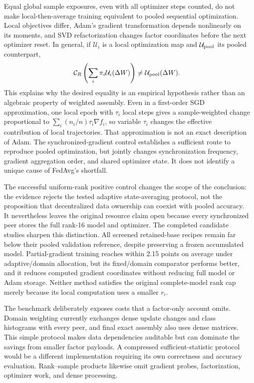 \documentclass[11pt]{article}
\newcommand{\dW}{\Delta W}
\begin{document}
Equal global sample exposures, even with all optimizer steps counted, do not make local-then-average training equivalent to pooled sequential optimization. Local objectives differ, Adam's gradient transformation depends nonlinearly on its moments, and SVD refactorization changes factor coordinates before the next optimizer reset. In general, if $\mathcal U_i$ is a local optimization map and $\mathcal U_{\rm pool}$ its pooled counterpart,
\begin{equation}
 \mathcal C_R\left(\sum_i\pi_i\mathcal U_i(\dW)\right)
 \ne \mathcal U_{\rm pool}(\dW).
\end{equation}
This explains why the desired equality is an empirical hypothesis rather than an algebraic property of weighted assembly. Even in a first-order SGD approximation, one local epoch with $\tau_i$ local steps gives a sample-weighted change proportional to $\sum_i(n_i/n)\tau_i\nabla f_i$, so variable $\tau_i$ changes the effective contribution of local trajectories. That approximation is not an exact description of Adam. The synchronized-gradient control establishes a sufficient route to reproduce pooled optimization, but jointly changes synchronization frequency, gradient aggregation order, and shared optimizer state. It does not identify a unique cause of FedAvg's shortfall.

The successful uniform-rank positive control changes the scope of the conclusion: the evidence rejects the tested adaptive state-averaging protocol, not the proposition that decentralized data ownership can coexist with pooled accuracy. It nevertheless leaves the original resource claim open because every synchronized peer stores the full rank-16 model and optimizer. The completed candidate studies sharpen this distinction. All screened retained-base recipes remain far below their pooled validation reference, despite preserving a frozen accumulated model. Partial-gradient training reaches within 2.15 points on average under adaptive/domain allocation, but its fixed/domain comparator performs better, and it reduces computed gradient coordinates without reducing full model or Adam storage. Neither method satisfies the original complete-model rank cap merely because its local computation uses a smaller $r_i$.

The benchmark deliberately exposes costs that a factor-only account omits. Domain weighting currently exchanges dense update changes and class histograms with every peer, and final exact assembly also uses dense matrices. This simple protocol makes data dependencies auditable but can dominate the savings from smaller factor payloads. A compressed sufficient-statistic protocol would be a different implementation requiring its own correctness and accuracy evaluation. Rank--sample products likewise omit gradient probes, factorization, optimizer work, and dense processing.
\end{document}
